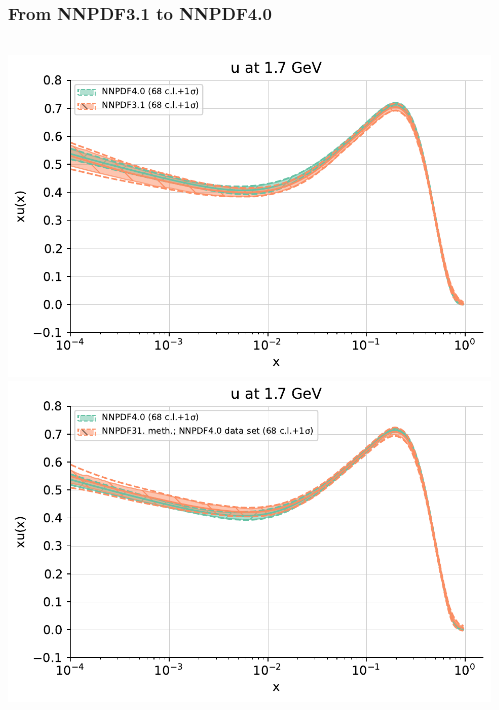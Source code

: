 \documentclass{beamer}
\begin{document}
\begin{frame}
 \frametitle{From NNPDF3.1 to NNPDF4.0}
 \footnotesize
 \centering
 \begin{columns}[c]
  \begin{column}{0.5\textwidth}
   \begin{overlayarea}{\columnwidth}{4cm}
    {
     \centering
     \includegraphics[width=\columnwidth]{plots/u_fit_1}\\    
    }
    {
     \centering
     \includegraphics[width=\columnwidth]{plots/u_fit_2}\\    
    }
   \end{overlayarea}
  \end{column}
  \begin{column}{0.5\textwidth}
   \begin{overlayarea}{\columnwidth}{4cm}
    {
     \centering
}
\end{overlayarea}
\end{column}
\end{columns}
\end{frame}
\end{document}
